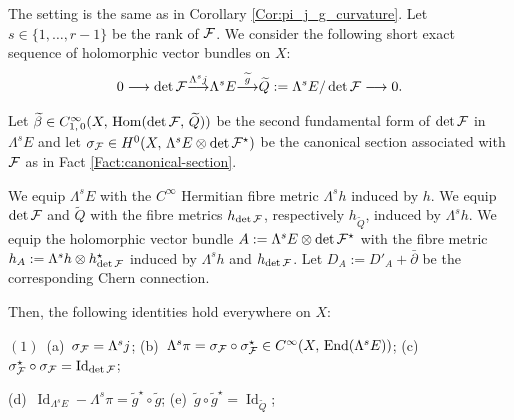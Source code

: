 \documentclass[12pt]{article}
\begin{document}
\begin{Cor}\label{Cor:Lambda_s_exact-seq} The setting is the same as in Corollary \ref{Cor:pi_j_g_curvature}. Let $s\in\{1,\dots , r-1\}$ be the rank of ${\cal F}$. We consider the following short exact sequence of holomorphic vector bundles on $X$: \begin{eqnarray}\label{eqn:det_F_short-exact-seq}0\longrightarrow \det{\cal F} {\stackrel{\Lambda^s j}{\longrightarrow}} \Lambda^sE {\stackrel{\widetilde{g}}{\longrightarrow}} \widetilde{Q}:= \Lambda^sE/\det {\cal F}\longrightarrow 0.\end{eqnarray}

  Let $\widetilde\beta\in C^\infty_{1,\,0}(X,\,\operatorname{Hom}(\det{\cal F},\,\widetilde{Q}))$ be the second fundamental form of $\det{\cal F}$ in $\Lambda^sE$ and let $\sigma_{\cal F}\in H^0(X,\,\Lambda^sE\otimes\det{\cal F}^\star)$ be the canonical section associated with ${\cal F}$ as in Fact \ref{Fact:canonical-section}.

  We equip $\Lambda^sE$ with the $C^\infty$ Hermitian fibre metric $\Lambda^sh$ induced by $h$. We equip $\det{\cal F}$ and $\widetilde{Q}$ with the fibre metrics $h_{\det\cal F}$, respectively $h_{\widetilde{Q}}$, induced by $\Lambda^sh$. We equip the holomorphic vector bundle $A:=\Lambda^sE\otimes\det{\cal F}^\star$ with the fibre metric $h_A:=\Lambda^sh\otimes h_{\det\cal F}^\star$ induced by $\Lambda^sh$ and $h_{\det\cal F}$. Let $D_A:=D'_A + \bar\partial$ be the corresponding Chern connection.  

\vspace{1ex}

Then, the following identities hold everywhere on $X$:

\vspace{1ex}

$(1)$\, (a)\, $\sigma_{\cal F} = \Lambda^s j$; \hspace{5ex} (b)\, $\Lambda^s\pi = \sigma_{\cal F}\circ\sigma_{\cal F}^\star\in C^\infty(X,\,\operatorname{End}(\Lambda^sE))$;   \hspace{5ex} (c)\, $\sigma_{\cal F}^\star\circ\sigma_{\cal F} = \operatorname{Id}_{\det\cal F}$;

\vspace{1ex}

\hspace{3ex} (d)\, $\operatorname{Id}_{\Lambda^sE} - \Lambda^s\pi = \widetilde{g}^\star\circ\widetilde{g}$; \hspace{5ex} (e)\, $\widetilde{g}\circ\widetilde{g}^\star = \operatorname{Id}_{\widetilde{Q}}$;


\end{Cor}
\end{document}
